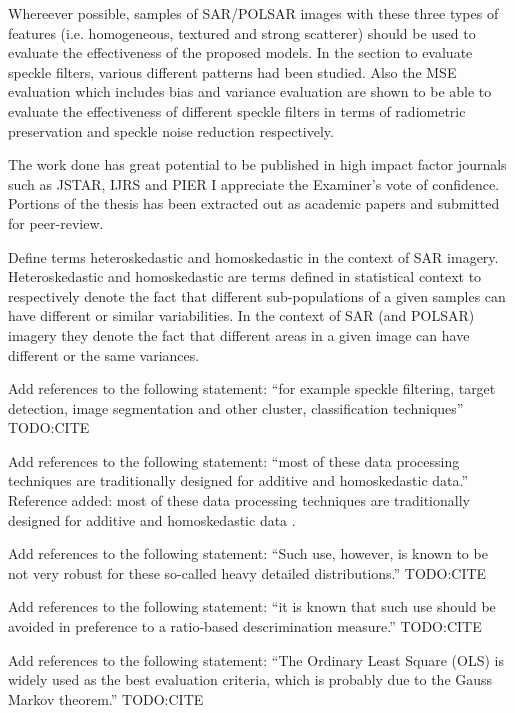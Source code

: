 \replyToComment
    {Whereever possible, samples of SAR/POLSAR images with these three types of features (i.e. homogeneous, textured and strong scatterer) should be used to evaluate the effectiveness of the proposed models.}
    {In the section to evaluate speckle filters, various different patterns had been studied. Also the MSE evaluation which includes bias and variance evaluation are shown to be able to evaluate the effectiveness of different speckle filters in terms of radiometric preservation and speckle noise reduction respectively.}
    
\replyToComment
    {The work done has great potential to be published in high impact factor journals such as JSTAR, IJRS and PIER}
    {I appreciate the Examiner's vote of confidence. Portions of the thesis has been extracted out as academic papers and submitted for peer-review.}    

\replyToComment
    {Define terms heteroskedastic and homoskedastic in the context of SAR imagery.}
    {Heteroskedastic and homoskedastic are terms defined in statistical context to respectively denote the fact that different sub-populations of a given samples can have different or similar variabilities. In the context of SAR (and POLSAR) imagery they denote the fact that different areas in a given image can have different or the same variances.}

\replyToComment
    {Add references to the following statement: ``for example speckle filtering, target detection, image segmentation and other cluster, classification techniques''}
    {TODO:CITE}

\replyToComment
    {Add references to the following statement: ``most of these data processing techniques are traditionally designed for additive and homoskedastic data.''}
    {Reference added: most of these data processing techniques are traditionally designed for additive and homoskedastic data \cite{Dutch_LNCS_2004}.}

\replyToComment
    {Add references to the following statement: ``Such use, however, is known to be not very robust for these so-called heavy detailed distributions.''}
    {TODO:CITE}
    
\replyToComment
    {Add references to the following statement: ``it is known that such use should be avoided in preference to a ratio-based descrimination measure.''}
    {TODO:CITE}

\replyToComment
    {Add references to the following statement: ``The Ordinary Least Square (OLS) is widely used as the best evaluation criteria, which is probably due to the Gauss Markov theorem.''}
    {TODO:CITE}

